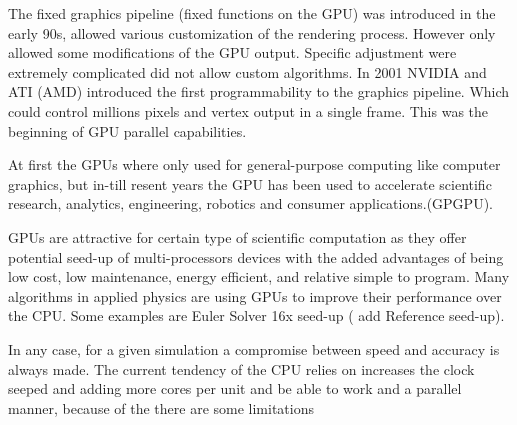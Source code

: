 The fixed graphics pipeline (fixed functions on the GPU) was introduced in the early 90s, allowed various customization of the rendering process. However only allowed some modifications of the GPU output. Specific adjustment were extremely complicated did not allow custom algorithms. In 2001 NVIDIA and ATI (AMD) introduced the first programmability to the graphics pipeline. Which could control millions pixels and vertex output in a single frame. This was the beginning of GPU parallel capabilities.

At first the GPUs where only used for general-purpose computing like computer graphics, but in-till resent years the GPU has been used to accelerate scientific research, analytics, engineering, robotics and consumer applications.(GPGPU)\cite{physicsgpu}.

GPUs are attractive for certain type of scientific computation as they offer potential seed-up of multi-processors devices with the added advantages of being low cost, low maintenance, energy efficient, and relative simple to program. Many algorithms in applied physics are using GPUs to improve their performance over the CPU. Some examples are Euler Solver 16x seed-up ( add Reference seed-up).

In any case, for a given simulation a compromise between speed and accuracy is always made. The current tendency of the CPU relies on increases the clock seeped and adding more cores per unit and be able to work and a parallel manner, because of the there are some limitations\cite{quantitative}

